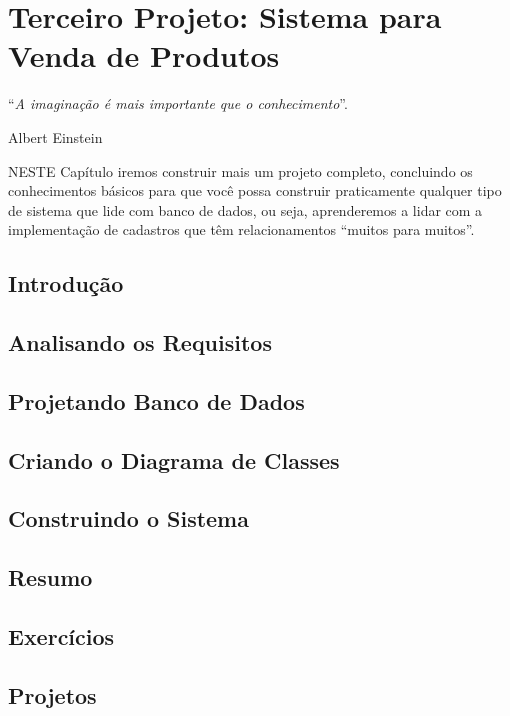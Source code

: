 \chapter{Terceiro Projeto: Sistema para Venda de Produtos}\label{cap:terceiroProjeto}
\epigraph{``\textit{A imaginação é mais importante que o conhecimento}''.}{Albert Einstein}

\lettrine[lines=4, lhang=0.1, lraise=0, loversize=0.2, findent=0.1em]{\textcolor{corAzulTema}{N}}{ESTE} Capítulo iremos construir mais um projeto completo, concluindo os conhecimentos básicos para que você possa construir praticamente qualquer tipo de sistema que lide com banco de dados, ou seja, aprenderemos a lidar com a implementação de cadastros que têm relacionamentos ``muitos para muitos''.

\section{Introdução}

\section{Analisando os Requisitos}

\section{Projetando Banco de Dados}

\section{Criando o Diagrama de Classes}

\section{Construindo o Sistema}

\section{Resumo}

\section{Exercícios}

\section{Projetos}
